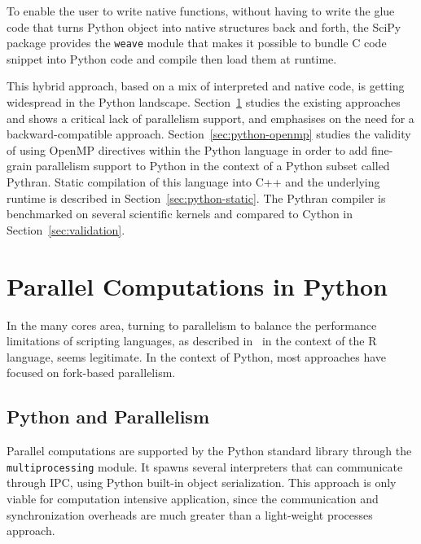\documentclass{llncs}
\begin{document}
To enable the user to write native functions, without having to write the glue
code that turns Python object into native structures back and forth, the SciPy
package provides the \texttt{weave} module that makes it possible to bundle C
code snippet into Python code and compile then load them at runtime.


This hybrid approach, based on a mix of interpreted and native code, is getting
widespread in the Python landscape. Section~\ref{sec:python-parallel} studies
the existing approaches and shows a critical lack of parallelism support, and
emphasises on the need for a backward-compatible approach.
Section~\ref{sec:python-openmp} studies the validity of using OpenMP directives
within the Python language in order to add fine-grain parallelism support to
Python in the context of a Python subset called Pythran. Static compilation of
this language into C++ and the underlying runtime is described in
Section~\ref{sec:python-static}. The Pythran compiler is benchmarked on several
scientific kernels and compared to Cython in Section~\ref{sec:validation}.

\section{Parallel Computations in Python}\label{sec:python-parallel}

In the many cores area, turning to parallelism to balance the performance
limitations of scripting languages, as described 
in~\cite{mals07} in the context of the R language, seems legitimate. In the
context of Python, most approaches have focused on fork-based parallelism.

\subsection{Python and Parallelism}

Parallel computations are supported by the Python standard library through the
\texttt{multiprocessing} module. It spawns several interpreters that can
communicate through IPC, using Python built-in object serialization. This
approach is only viable for computation intensive application, since the
communication and synchronization overheads are much greater than a light-weight
processes approach.
\end{document}
